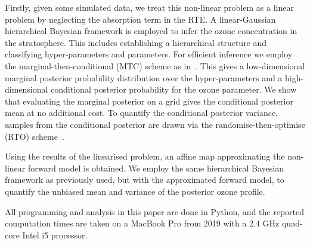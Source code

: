 \documentclass{article}
\begin{document}
Firstly, given some simulated data, we treat this non-linear problem as a linear problem by neglecting the absorption term in the RTE.
A linear-Gaussian hierarchical Bayesian framework is employed to infer the ozone concentration in the stratosphere.
This includes establishing a hierarchical structure and classifying hyper-parameters and parameters.
For efficient inference we employ the marginal-then-conditional (MTC) scheme as in~\cite{fox2016fast}.
This gives a low-dimensional marginal posterior probability distribution over the hyper-parameters and a high-dimensional conditional posterior probability for the ozone parameter.
We show that evaluating the marginal posterior on a grid gives the conditional posterior mean at no additional cost.
To quantify the conditional posterior variance, samples from the conditional posterior are drawn via the randomise-then-optimise (RTO) scheme~\cite{bardsley2012mcmc}.

Using the results of the linearised problem, an affine map approximating the non-linear forward model is obtained.
We employ the same hierarchical Bayesian framework as previously used, but with the approximated forward model, to quantify the unbiased mean and variance of the posterior ozone profile.

All programming and analysis in this paper are done in Python, and the reported computation times are taken on a MacBook Pro from 2019 with a 2.4 GHz quad-core Intel i5 processor.
\end{document}
